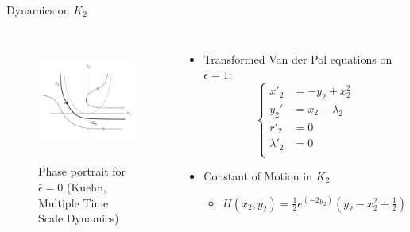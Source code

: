 \documentclass[11pt]{beamer}
\begin{document}
\begin{frame}{Dynamics on $K_2$}
\begin{columns}
\begin{figure}
    \centering
    \includegraphics[height=4cm,width=6cm]{Dynamics_in_K2.png}
    \caption{Phase portrait for $\bar{\epsilon}=0$ (Kuehn, Multiple Time Scale Dynamics)}

\end{figure}
\begin{itemize}
\item Transformed Van der Pol equations on $ \epsilon=1$:
\begin{equation*}
    \begin{cases}
        x'_2&=-y_2+x_2^2\\
         y_2'&=x_2-\lambda_2\\
        r'_2&=0\\
        \lambda'_2&=0\\
    \end{cases}
\end{equation*}
\item Constant of Motion in $ K_2 $
\begin{itemize}
	\item $H(x_2,y_2)=\frac{1}{2}e^{(-2y_2)}\left(y_2-x^2_2+\frac{1}{2}\right)$
\end{itemize}

\end{itemize}
\end{columns}
\end{frame}
\end{document}
